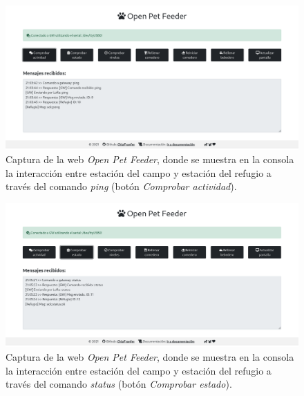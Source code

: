 \documentclass[12pt]{article}
\begin{document}
	\pagebreak
	
	\begin{figure}[h!]
		\begin{center}
			\includegraphics[width=1\textwidth]{img_comp/captura_web_2.png}
			\caption{Captura de la web \textit{Open Pet Feeder}, donde se muestra en la consola la interacción entre estación del campo y estación del refugio a través del comando \textit{ping} (botón \textit{Comprobar actividad}).}
			\label{captura web 2}
		\end{center}
	\end{figure}
	
	\pagebreak
	
	\begin{figure}[h!]
		\begin{center}
			\includegraphics[width=1\textwidth]{img_comp/captura_web_3.png}
			\caption{Captura de la web \textit{Open Pet Feeder}, donde se muestra en la consola la interacción entre estación del campo y estación del refugio a través del comando \textit{status} (botón \textit{Comprobar estado}).}
			\label{captura web 3}
		\end{center}
	\end{figure}

	\pagebreak
	
\end{document}
